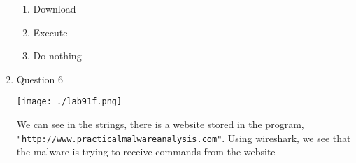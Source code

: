 \documentclass[11pt]{article}
\begin{document}
\begin{enumerate}
\begin{enumerate}
\item Download

\item Execute

\item Do nothing
\end{enumerate}

\item Question 6
\label{sec:org7f05ef4}

\begin{center}
\texttt{[image: ./lab91f.png]}
\end{center}

We can see in the strings, there is a website stored in the program, \texttt{"http://www.practicalmalwareanalysis.com"}. Using wireshark, we see that the malware is trying to receive commands from the website
\end{enumerate}
\end{document}
